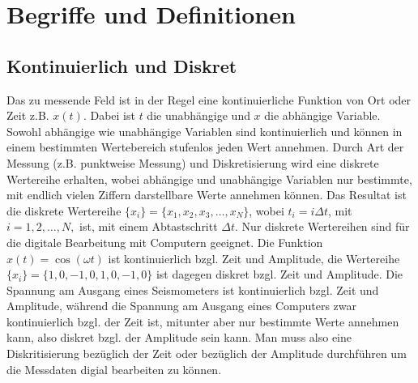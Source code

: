 \chapter{Begriffe und Definitionen}
\section{Kontinuierlich und Diskret}
Das zu messende Feld ist in der Regel eine kontinuierliche Funktion von Ort oder Zeit z.B. $x(t)$. Dabei ist $t$ die unabhängige und $x$ die abhängige Variable. Sowohl abhängige wie unabhängige Variablen sind kontinuierlich und können in einem bestimmten Wertebereich stufenlos jeden Wert annehmen. Durch Art der Messung (z.B. punktweise Messung) und Diskretisierung wird eine diskrete Wertereihe erhalten, wobei abhängige und unabhängige Variablen nur bestimmte, mit endlich vielen Ziffern darstellbare Werte annehmen können. Das Resultat ist die diskrete Wertereihe  $\{x_{i}\}=\{x_{1}, x_{2}, x_{3}, \dots, x_N\}$, wobei $t_{i}=i\Delta t$, mit $i=1,2, \dots, N,$ ist, mit einem Abtastschritt $\Delta t$. Nur diskrete Wertereihen sind für die digitale Bearbeitung mit Computern geeignet.  Die Funktion $x(t)=\cos(\omega t)$ ist kontinuierlich bzgl. Zeit und Amplitude, die Wertereihe $\{ x_i \}= \{1,0,-1,0,1,0,-1,0\}$ ist dagegen diskret bzgl. Zeit und Amplitude. Die Spannung am Ausgang eines Seismometers ist kontinuierlich bzgl. Zeit und Amplitude, während die Spannung am Ausgang eines Computers zwar kontinuierlich bzgl. der Zeit ist, mitunter aber nur bestimmte Werte annehmen kann, also diskret bzgl. der Amplitude sein kann. Man muss also eine Diskritisierung bezüglich der Zeit oder bezüglich der Amplitude durchführen um die Messdaten digial bearbeiten zu können.\\


